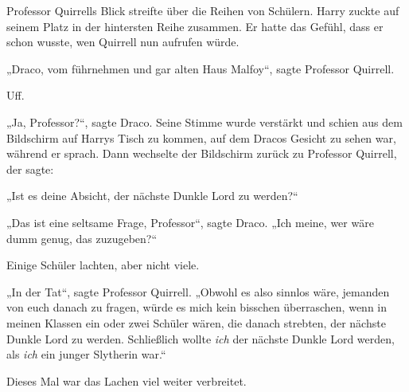 Professor Quirrells Blick streifte über die Reihen von Schülern. Harry zuckte auf seinem Platz in der hintersten Reihe zusammen. Er hatte das Gefühl, dass er schon wusste, wen Quirrell nun aufrufen würde.

„Draco, vom führnehmen und gar alten Haus Malfoy“, sagte Professor Quirrell.

Uff.

„Ja, Professor?“, sagte Draco. Seine Stimme wurde verstärkt und schien aus dem Bildschirm auf Harrys Tisch zu kommen, auf dem Dracos Gesicht zu sehen war, während er sprach. Dann wechselte der Bildschirm zurück zu Professor Quirrell, der sagte:

„Ist es deine Absicht, der nächste Dunkle Lord zu werden?“

„Das ist eine seltsame Frage, Professor“, sagte Draco. „Ich meine, wer wäre dumm genug, das zuzugeben?“

Einige Schüler lachten, aber nicht viele.

„In der Tat“, sagte Professor Quirrell. „Obwohl es also sinnlos wäre, jemanden von euch danach zu fragen, würde es mich kein bisschen überraschen, wenn in meinen Klassen ein oder zwei Schüler wären, die danach strebten, der nächste Dunkle Lord zu werden. Schließlich wollte \emph{ich} der nächste Dunkle Lord werden, als \emph{ich} ein junger Slytherin war.“

Dieses Mal war das Lachen viel weiter verbreitet.

